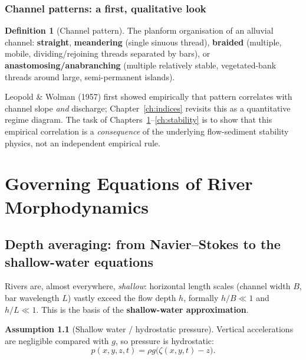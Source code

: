 \documentclass[11pt,a4paper]{report}
\theoremstyle{definition}
\newtheorem{definition}{Definition}[chapter]
\newtheorem{assumption}{Assumption}[chapter]
\theoremstyle{plain}
\theoremstyle{remark}
\begin{document}
\subsection{Channel patterns: a first, qualitative look}
\begin{definition}[Channel pattern]
The planform organisation of an alluvial channel: \textbf{straight}, \textbf{meandering} (single sinuous thread), \textbf{braided} (multiple, mobile, dividing/rejoining threads separated by bars), or \textbf{anastomosing/anabranching} (multiple relatively stable, vegetated-bank threads around large, semi-permanent islands).
\end{definition}
Leopold \& Wolman (1957) first showed empirically that pattern correlates with channel slope \emph{and} discharge; Chapter~\ref{ch:indices} revisits this as a quantitative regime diagram. The task of Chapters~\ref{ch:governing}--\ref{ch:stability} is to show that this empirical correlation is a \emph{consequence} of the underlying flow-sediment stability physics, not an independent empirical rule.

\chapter{Governing Equations of River Morphodynamics}
\label{ch:governing}

\section{Depth averaging: from Navier--Stokes to the shallow-water equations}
\label{sec:shallowwater}

Rivers are, almost everywhere, \emph{shallow}: horizontal length scales (channel width $B$, bar wavelength $L$) vastly exceed the flow depth $h$, formally $h/B \ll 1$ and $h/L\ll1$. This is the basis of the \textbf{shallow-water approximation}.

\begin{assumption}[Shallow water / hydrostatic pressure]
Vertical accelerations are negligible compared with $g$, so pressure is hydrostatic:
\begin{equation}
p(x,y,z,t) = \rho g\big(\zeta(x,y,t) - z\big).
\label{eq:hydrostatic}
\end{equation}
\end{assumption}
\end{document}
